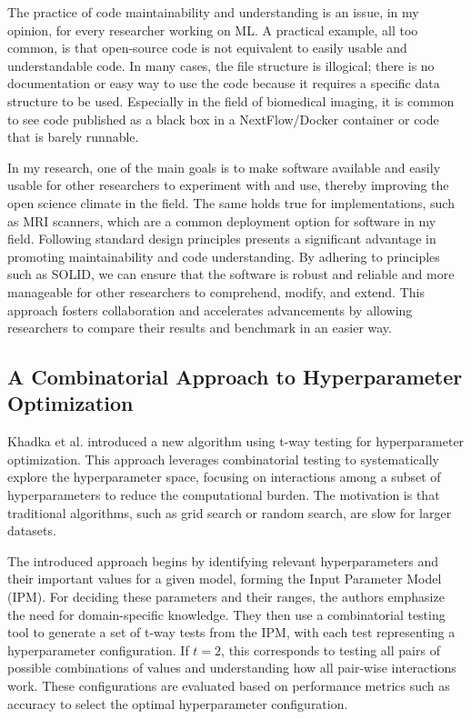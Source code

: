 \documentclass[a4paper, 11pt]{article}
\begin{document}
The practice of code maintainability and understanding is an issue, in my opinion, for every researcher working on ML. A practical example, all too common, is that open-source code is not equivalent to easily usable and understandable code. In many cases, the file structure is illogical; there is no documentation or easy way to use the code because it requires a specific data structure to be used. Especially in the field of biomedical imaging, it is common to see code published as a black box in a NextFlow/Docker container or code that is barely runnable.

In my research, one of the main goals is to make software available and easily usable for other researchers to experiment with and use, thereby improving the open science climate in the field. The same holds true for implementations, such as MRI scanners, which are a common deployment option for software in my field. Following standard design principles presents a significant advantage in promoting maintainability and code understanding. By adhering to principles such as SOLID, we can ensure that the software is robust and reliable and more manageable for other researchers to comprehend, modify, and extend. This approach fosters collaboration and accelerates advancements by allowing researchers to compare their results and benchmark in an easier way. 



\subsection{A Combinatorial Approach to Hyperparameter Optimization}

Khadka et al. \cite{khadka_combinatorial_2024} introduced a new algorithm using t-way testing for hyperparameter optimization. This approach leverages combinatorial testing to systematically explore the hyperparameter space, focusing on interactions among a subset of hyperparameters to reduce the computational burden. The motivation is that traditional algorithms, such as grid search or random search, are slow for larger datasets.

The introduced approach begins by identifying relevant hyperparameters and their important values for a given model, forming the Input Parameter Model (IPM). For deciding these parameters and their ranges, the authors emphasize the need for domain-specific knowledge. They then use a combinatorial testing tool to generate a set of t-way tests from the IPM, with each test representing a hyperparameter configuration. If $t=2$, this corresponds to testing all pairs of possible combinations of values and understanding how all pair-wise interactions work. These configurations are evaluated based on performance metrics such as accuracy to select the optimal hyperparameter configuration.
\end{document}
